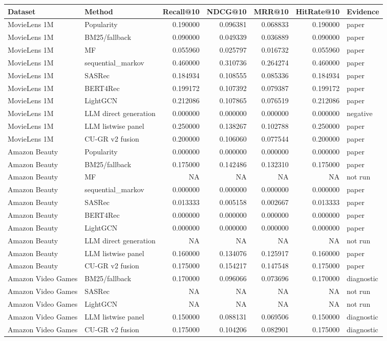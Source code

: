 \begin{tabular}{llrrrrl}
\toprule
Dataset & Method & Recall@10 & NDCG@10 & MRR@10 & HitRate@10 & Evidence \\
\midrule
MovieLens 1M & Popularity & 0.190000 & 0.096381 & 0.068833 & 0.190000 & paper \\
MovieLens 1M & BM25/fallback & 0.090000 & 0.049339 & 0.036889 & 0.090000 & paper \\
MovieLens 1M & MF & 0.055960 & 0.025797 & 0.016732 & 0.055960 & paper \\
MovieLens 1M & sequential\_markov & 0.460000 & 0.310736 & 0.264274 & 0.460000 & paper \\
MovieLens 1M & SASRec & 0.184934 & 0.108555 & 0.085336 & 0.184934 & paper \\
MovieLens 1M & BERT4Rec & 0.199172 & 0.107392 & 0.079387 & 0.199172 & paper \\
MovieLens 1M & LightGCN & 0.212086 & 0.107865 & 0.076519 & 0.212086 & paper \\
MovieLens 1M & LLM direct generation & 0.000000 & 0.000000 & 0.000000 & 0.000000 & negative \\
MovieLens 1M & LLM listwise panel & 0.250000 & 0.138267 & 0.102788 & 0.250000 & paper \\
MovieLens 1M & CU-GR v2 fusion & 0.200000 & 0.106060 & 0.077544 & 0.200000 & paper \\
Amazon Beauty & Popularity & 0.000000 & 0.000000 & 0.000000 & 0.000000 & paper \\
Amazon Beauty & BM25/fallback & 0.175000 & 0.142486 & 0.132310 & 0.175000 & paper \\
Amazon Beauty & MF & NA & NA & NA & NA & not run \\
Amazon Beauty & sequential\_markov & 0.000000 & 0.000000 & 0.000000 & 0.000000 & paper \\
Amazon Beauty & SASRec & 0.013333 & 0.005158 & 0.002667 & 0.013333 & paper \\
Amazon Beauty & BERT4Rec & 0.000000 & 0.000000 & 0.000000 & 0.000000 & paper \\
Amazon Beauty & LightGCN & 0.000000 & 0.000000 & 0.000000 & 0.000000 & paper \\
Amazon Beauty & LLM direct generation & NA & NA & NA & NA & not run \\
Amazon Beauty & LLM listwise panel & 0.160000 & 0.134076 & 0.125917 & 0.160000 & paper \\
Amazon Beauty & CU-GR v2 fusion & 0.175000 & 0.154217 & 0.147548 & 0.175000 & paper \\
Amazon Video Games & BM25/fallback & 0.170000 & 0.096066 & 0.073696 & 0.170000 & diagnostic \\
Amazon Video Games & SASRec & NA & NA & NA & NA & not run \\
Amazon Video Games & LightGCN & NA & NA & NA & NA & not run \\
Amazon Video Games & LLM listwise panel & 0.150000 & 0.088131 & 0.069506 & 0.150000 & diagnostic \\
Amazon Video Games & CU-GR v2 fusion & 0.175000 & 0.104206 & 0.082901 & 0.175000 & diagnostic \\
\bottomrule
\end{tabular}
